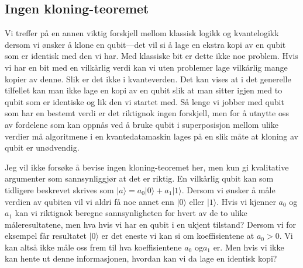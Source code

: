 \subsection{Ingen kloning-teoremet}
Vi treffer på en annen viktig forskjell mellom klassisk logikk og kvantelogikk dersom vi ønsker å klone en qubit---det vil si å lage en ekstra kopi av en qubit som er identisk med den vi har. Med klassiske bit er dette ikke noe problem. Hvis vi har en bit med en vilkårlig verdi kan vi uten problemer lage vilkårlig mange kopier av denne. Slik er det ikke i kvanteverden. Det kan vises at i det generelle tilfellet kan man ikke lage en kopi av en qubit slik at man sitter igjen med to qubit som er identiske og lik den vi startet med. Så lenge vi jobber med qubit som har en bestemt verdi er det riktignok ingen forskjell, men for å utnytte oss av fordelene som kan oppnås ved å bruke qubit i superposisjon mellom ulike verdier må algoritmene i en kvantedatamaskin lages på en slik måte at kloning av qubit er unødvendig.

Jeg vil ikke forsøke å bevise ingen kloning-teoremet her, men kun gi kvalitative argumenter som sannsynliggjør at det er riktig. En vilkårlig qubit kan som tidligere beskrevet skrives som $|a\rangle = a_0|0\rangle + a_1|1\rangle$. Dersom vi ønsker å måle verdien av qubiten vil vi aldri få noe annet enn $|0\rangle$ eller $|1\rangle$. Hvis vi kjenner $a_0$ og $a_1$ kan vi riktignok beregne sannsynligheten for hvert av de to ulike måleresultatene, men hva hvis vi har en qubit i en ukjent tilstand? Dersom vi for eksempel får resultatet $|0\rangle$ er det eneste vi kan si om koeffisientene at $a_0>0$. Vi kan altså ikke måle oss frem til hva koeffisientene $a_0$ og$a_1$ er. Men hvis vi ikke kan hente ut denne informasjonen, hvordan kan vi da lage en identisk kopi? 